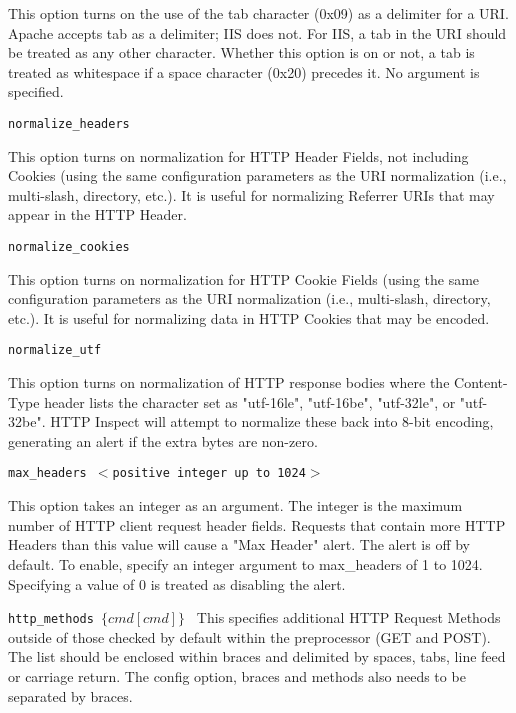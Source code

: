 \documentclass[english]{report}
\newcounter{slistnum}
\newenvironment{slist}
{ \begin{list}{ {\bf \arabic{slistnum}.} }{\usecounter{slistnum} } }
{ \end{list} }
\begin{document}
\begin{slist}
This option turns on the use of the tab character (0x09) as a delimiter for a
URI.  Apache accepts tab as a delimiter; IIS does not.  For IIS, a tab in the
URI should be treated as any other character.  Whether this option is on or
not, a tab is treated as whitespace if a space character (0x20) precedes it.
No argument is specified.

\item \texttt{normalize\_headers}

This option turns on normalization for HTTP Header Fields, not including
Cookies (using the same configuration parameters as the URI normalization (i.e.,
multi-slash, directory, etc.).  It is useful for normalizing Referrer URIs that
may appear in the HTTP Header.

\item \texttt{normalize\_cookies}

This option turns on normalization for HTTP Cookie Fields (using the same
configuration parameters as the URI normalization (i.e., multi-slash, directory,
etc.).  It is useful for normalizing data in HTTP Cookies that may be encoded.

\item \texttt{normalize\_utf}

This option turns on normalization of HTTP response bodies where the Content-Type
header lists the character set as "utf-16le", "utf-16be", "utf-32le", or
"utf-32be". HTTP Inspect will attempt to normalize these back into 8-bit encoding,
generating an alert if the extra bytes are non-zero.

\item \texttt{max\_headers $<$positive integer up to 1024$>$}

This option takes an integer as an argument.  The integer is the maximum number
of HTTP client request header fields.  Requests that contain more HTTP Headers
than this value will cause a "Max Header" alert.  The alert is off by default.
To enable, specify an integer argument to max\_headers of 1 to 1024.
Specifying a value of 0 is treated as disabling the alert.

\item \texttt{http\_methods $\{ cmd [cmd] \}$ } 
This specifies additional HTTP Request Methods outside of those checked by
default within the preprocessor (GET and POST). The list should be enclosed
within braces and delimited by spaces, tabs, line feed or carriage return. 
The config option, braces and methods also needs to be separated by braces.


\end{slist}
\end{document}
